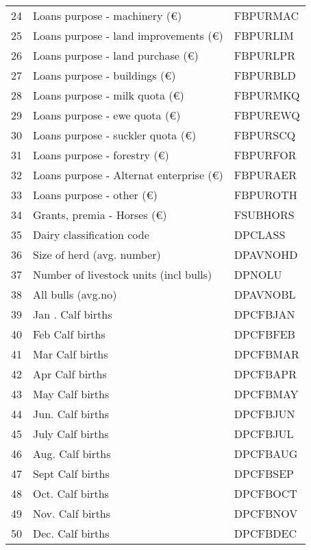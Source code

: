 \documentclass{article}\usepackage{graphicx, color}
\begin{document}
\begin{flushleft}
\begin{table}[ht]
\begin{center}
\begin{tabular}{rll}
  24 & Loans purpose - machinery     (€) & FBPURMAC \\ 
  25 & Loans purpose - land improvements (€) & FBPURLIM \\ 
  26 & Loans purpose - land purchase     (€) & FBPURLPR \\ 
  27 & Loans purpose - buildings     (€) & FBPURBLD \\ 
  28 & Loans purpose - milk quota    (€) & FBPURMKQ \\ 
  29 & Loans purpose - ewe quota     (€) & FBPUREWQ \\ 
  30 & Loans purpose - suckler quota (€) & FBPURSCQ \\ 
  31 & Loans purpose - forestry      (€) & FBPURFOR \\ 
  32 & Loans purpose - Alternat enterprise (€) & FBPURAER \\ 
  33 & Loans purpose - other         (€) & FBPUROTH \\ 
  34 & Grants, premia - Horses      (€) & FSUBHORS \\ 
  35 & Dairy classification code & DPCLASS \\ 
  36 & Size of herd  (avg. number) & DPAVNOHD \\ 
  37 & Number of livestock units (incl bulls) & DPNOLU \\ 
  38 & All bulls (avg.no) & DPAVNOBL \\ 
  39 & Jan .  Calf births & DPCFBJAN \\ 
  40 & Feb    Calf births & DPCFBFEB \\ 
  41 & Mar    Calf births & DPCFBMAR \\ 
  42 & Apr    Calf births & DPCFBAPR \\ 
  43 & May    Calf births & DPCFBMAY \\ 
  44 & Jun.   Calf births & DPCFBJUN \\ 
  45 & July   Calf births & DPCFBJUL \\ 
  46 & Aug.   Calf births & DPCFBAUG \\ 
  47 & Sept   Calf births & DPCFBSEP \\ 
  48 & Oct.   Calf births & DPCFBOCT \\ 
  49 & Nov.   Calf births & DPCFBNOV \\ 
  50 & Dec.   Calf births & DPCFBDEC \\ 
   \hline
\end{tabular}
\end{center}
\end{table}



\end{flushleft}
\end{document}
